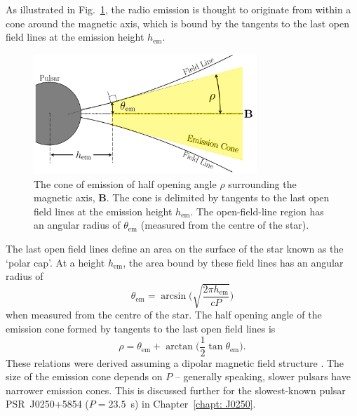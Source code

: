 As illustrated in Fig.~\ref{fig: intro - emission cone}, the radio emission is thought to originate from within a cone around the magnetic axis, which is bound by the tangents to the last open field lines at the emission height $h_\mathrm{em}$.  
\begin{figure}
    \begin{center}
        \includegraphics[width=0.75\textwidth]{Figures/Introduction/cone}
        \caption[The geometry of the emission cone]{The cone of emission of half opening angle $\rho$ surrounding the magnetic axis, $\mathbf{B}$. The cone is delimited by tangents to the last open field lines at the emission height $h_\mathrm{em}$. The open-field-line region has an angular radius of $\theta_\mathrm{em}$ (measured from the centre of the star).}
        \label{fig: intro - emission cone}
    \end{center}
\end{figure}
The last open field lines define an area on the surface of the star known as the `polar cap'. At a height $h_\mathrm{em}$, the area bound by these field lines has an angular radius of 
\begin{equation}
    \label{eq: intro - polar cap radius}
	\theta_\mathrm{em} = \arcsin\bigg(\sqrt{\frac{2\pi h_\mathrm{em}}{cP}}\bigg)
\end{equation} 
when measured from the centre of the star. The half opening angle of the emission cone formed by tangents to the last open field lines is
\begin{equation}
    \label{eq: intro - cone half opening angle}
	\rho = \theta_\mathrm{em} + \arctan\bigg(\frac{1}{2}\tan\theta_\mathrm{em}\bigg).
\end{equation} 
These relations were derived assuming a dipolar magnetic field structure \citep[see][]{PulsarAstronomy}. The size of the emission cone depends on $P$ -- generally speaking, slower pulsars have narrower emission cones. This is discussed further for the slowest-known pulsar PSR~J0250+5854 ($P = 23.5$~s) in Chapter~\ref{chapt: J0250}.








